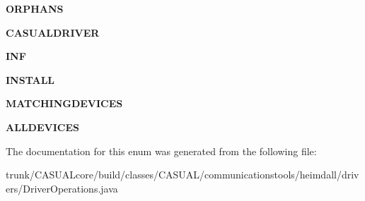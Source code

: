 \begin{DoxyCompactItemize}
\item 
\hypertarget{enum_c_a_s_u_a_l_1_1communicationstools_1_1heimdall_1_1drivers_1_1_driver_operations_1_1_pattern_choice_a4f062cda6c8b214e97e74aad13bb2b85}{{\bfseries O\-R\-P\-H\-A\-N\-S}}\label{enum_c_a_s_u_a_l_1_1communicationstools_1_1heimdall_1_1drivers_1_1_driver_operations_1_1_pattern_choice_a4f062cda6c8b214e97e74aad13bb2b85}

\item 
\hypertarget{enum_c_a_s_u_a_l_1_1communicationstools_1_1heimdall_1_1drivers_1_1_driver_operations_1_1_pattern_choice_a484c57fb36edfae7b8aa4c2995d534b3}{{\bfseries C\-A\-S\-U\-A\-L\-D\-R\-I\-V\-E\-R}}\label{enum_c_a_s_u_a_l_1_1communicationstools_1_1heimdall_1_1drivers_1_1_driver_operations_1_1_pattern_choice_a484c57fb36edfae7b8aa4c2995d534b3}

\item 
\hypertarget{enum_c_a_s_u_a_l_1_1communicationstools_1_1heimdall_1_1drivers_1_1_driver_operations_1_1_pattern_choice_ad3c80f05c2127474ba20b81ce7555a65}{{\bfseries I\-N\-F}}\label{enum_c_a_s_u_a_l_1_1communicationstools_1_1heimdall_1_1drivers_1_1_driver_operations_1_1_pattern_choice_ad3c80f05c2127474ba20b81ce7555a65}

\item 
\hypertarget{enum_c_a_s_u_a_l_1_1communicationstools_1_1heimdall_1_1drivers_1_1_driver_operations_1_1_pattern_choice_a13439fe139301a239832ddab8fd974fb}{{\bfseries I\-N\-S\-T\-A\-L\-L}}\label{enum_c_a_s_u_a_l_1_1communicationstools_1_1heimdall_1_1drivers_1_1_driver_operations_1_1_pattern_choice_a13439fe139301a239832ddab8fd974fb}

\item 
\hypertarget{enum_c_a_s_u_a_l_1_1communicationstools_1_1heimdall_1_1drivers_1_1_driver_operations_1_1_pattern_choice_a4930b27293acac15efcaffd3f291031d}{{\bfseries M\-A\-T\-C\-H\-I\-N\-G\-D\-E\-V\-I\-C\-E\-S}}\label{enum_c_a_s_u_a_l_1_1communicationstools_1_1heimdall_1_1drivers_1_1_driver_operations_1_1_pattern_choice_a4930b27293acac15efcaffd3f291031d}

\item 
\hypertarget{enum_c_a_s_u_a_l_1_1communicationstools_1_1heimdall_1_1drivers_1_1_driver_operations_1_1_pattern_choice_a0ee5e8439fab4533f7db23fbc97ab72c}{{\bfseries A\-L\-L\-D\-E\-V\-I\-C\-E\-S}}\label{enum_c_a_s_u_a_l_1_1communicationstools_1_1heimdall_1_1drivers_1_1_driver_operations_1_1_pattern_choice_a0ee5e8439fab4533f7db23fbc97ab72c}

\end{DoxyCompactItemize}


The documentation for this enum was generated from the following file\-:\begin{DoxyCompactItemize}
\item 
trunk/\-C\-A\-S\-U\-A\-Lcore/build/classes/\-C\-A\-S\-U\-A\-L/communicationstools/heimdall/drivers/Driver\-Operations.\-java\end{DoxyCompactItemize}
